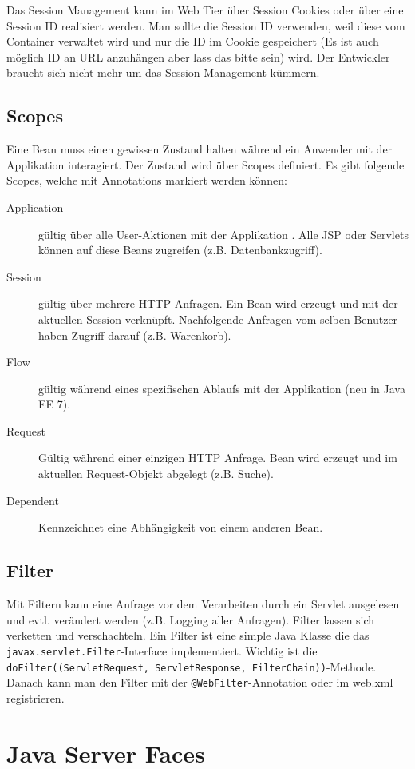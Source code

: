 Das Session Management kann im Web Tier über Session Cookies oder über eine Session ID realisiert werden. Man sollte die Session ID verwenden, weil diese vom Container verwaltet wird und nur die ID im Cookie gespeichert (Es ist auch möglich ID an URL anzuhängen aber lass das bitte sein) wird. Der Entwickler braucht sich nicht mehr um das Session-Management kümmern.

\subsection{Scopes}
\label{sec:scope}

Eine Bean muss einen gewissen Zustand halten während ein Anwender mit der Applikation interagiert. Der Zustand wird über Scopes definiert. Es gibt folgende Scopes, welche mit Annotations markiert werden können:
\begin{description}
	\item[Application] gültig über alle User-Aktionen mit der Applikation . Alle JSP oder Servlets können auf diese Beans zugreifen (z.B. Datenbankzugriff).
	\item[Session] gültig über mehrere HTTP Anfragen. Ein Bean wird erzeugt und mit der aktuellen Session verknüpft. Nachfolgende Anfragen vom selben Benutzer haben Zugriff darauf (z.B. Warenkorb).
	\item[Flow] gültig während eines spezifischen Ablaufs mit der Applikation (neu in Java EE 7). 
	\item[Request] Gültig während einer einzigen HTTP Anfrage. Bean wird erzeugt und im aktuellen Request-Objekt abgelegt (z.B. Suche).
	\item[Dependent] Kennzeichnet eine Abhängigkeit von einem anderen Bean.
\end{description}

\subsection{Filter}

Mit Filtern kann eine Anfrage vor dem Verarbeiten durch ein Servlet ausgelesen und evtl. verändert werden (z.B. Logging aller Anfragen). Filter lassen sich verketten und verschachteln. Ein Filter ist eine simple Java Klasse die das \verb|javax.servlet.Filter|-Interface implementiert. Wichtig ist die \verb|doFilter((ServletRequest, ServletResponse, FilterChain))|-Methode. Danach kann man den Filter mit der \verb|@WebFilter|-Annotation oder im web.xml registrieren.

\section{Java Server Faces}

